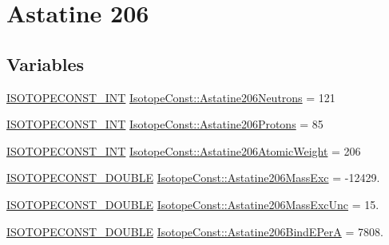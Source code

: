 \hypertarget{group___isotope_const-_astatine-_at206}{}\section{Astatine 206}
\label{group___isotope_const-_astatine-_at206}
\subsection*{Variables}
\begin{DoxyCompactItemize}
\item 
\mbox{\hyperlink{group___isotope_const-_macros_ga5f18360b3e99483a35c32d789e62621c}{I\+S\+O\+T\+O\+P\+E\+C\+O\+N\+S\+T\+\_\+\+I\+NT}} \mbox{\hyperlink{group___isotope_const-_astatine-_at206_ga20c0c10bce02475d88647648c79cf89d}{Isotope\+Const\+::\+Astatine206\+Neutrons}} = 121
\item 
\mbox{\hyperlink{group___isotope_const-_macros_ga5f18360b3e99483a35c32d789e62621c}{I\+S\+O\+T\+O\+P\+E\+C\+O\+N\+S\+T\+\_\+\+I\+NT}} \mbox{\hyperlink{group___isotope_const-_astatine-_at206_ga549b5c99a7fae2dfb0a259b76832d96d}{Isotope\+Const\+::\+Astatine206\+Protons}} = 85
\item 
\mbox{\hyperlink{group___isotope_const-_macros_ga5f18360b3e99483a35c32d789e62621c}{I\+S\+O\+T\+O\+P\+E\+C\+O\+N\+S\+T\+\_\+\+I\+NT}} \mbox{\hyperlink{group___isotope_const-_astatine-_at206_gae287c4f2af68b3f60b78c5457e78764b}{Isotope\+Const\+::\+Astatine206\+Atomic\+Weight}} = 206
\item 
\mbox{\hyperlink{group___isotope_const-_macros_ga8f45a7272ce02c0b4c65c44636ed719a}{I\+S\+O\+T\+O\+P\+E\+C\+O\+N\+S\+T\+\_\+\+D\+O\+U\+B\+LE}} \mbox{\hyperlink{group___isotope_const-_astatine-_at206_gadaa79e23c6c8ed2fcc063c6e25be313b}{Isotope\+Const\+::\+Astatine206\+Mass\+Exc}} = -\/12429.
\item 
\mbox{\hyperlink{group___isotope_const-_macros_ga8f45a7272ce02c0b4c65c44636ed719a}{I\+S\+O\+T\+O\+P\+E\+C\+O\+N\+S\+T\+\_\+\+D\+O\+U\+B\+LE}} \mbox{\hyperlink{group___isotope_const-_astatine-_at206_ga69be20969f0373a9a3fd0cff22a23ab7}{Isotope\+Const\+::\+Astatine206\+Mass\+Exc\+Unc}} = 15.
\item 
\mbox{\hyperlink{group___isotope_const-_macros_ga8f45a7272ce02c0b4c65c44636ed719a}{I\+S\+O\+T\+O\+P\+E\+C\+O\+N\+S\+T\+\_\+\+D\+O\+U\+B\+LE}} \mbox{\hyperlink{group___isotope_const-_astatine-_at206_gaf96f8f1b1b83e9c382b8c5102b82494f}{Isotope\+Const\+::\+Astatine206\+Bind\+E\+PerA}} = 7808.
\item 

\end{DoxyCompactItemize}
